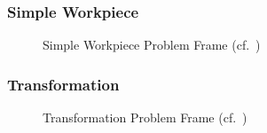 \documentclass{article}
\begin{document}
\subsubsection{Simple Workpiece}
\begin{figure}[htbp]
\centering

\caption{{Simple Workpiece} {Problem Frame} (cf.~\cite{Jackson:2001}) \label{fig:sw}}
\end{figure}


\subsubsection{Transformation}
\begin{figure}[htbp]
\centering

\caption{{Transformation} {Problem Frame} (cf.~\cite{Jackson:2001}) \label{fig:t}}
\end{figure}



\end{document}
